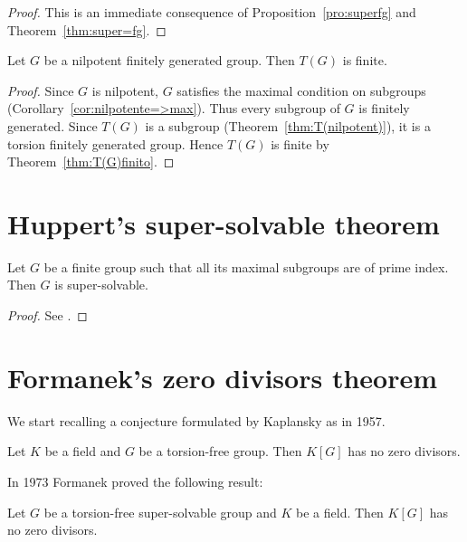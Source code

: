 \begin{proof}
    This is an immediate consequence of Proposition~\ref{pro:superfg} and 
    Theorem~\ref{thm:super=fg}.  
\end{proof}

\begin{theorem}
    Let $G$ be a nilpotent finitely generated group. Then $T(G)$ is finite. 
\end{theorem}

\begin{proof}
    Since $G$ is nilpotent, $G$ satisfies the maximal condition on subgroups 
    (Corollary~\ref{cor:nilpotente=>max}). Thus 
	every subgroup of $G$ is finitely generated. Since 
    $T(G)$ is a subgroup (Theorem~\ref{thm:T(nilpotent)}), it is a torsion finitely generated group. 
	Hence $T(G)$ is finite by Theorem~\ref{thm:T(G)finito}.
\end{proof}

\section{Huppert's super-solvable theorem}

\begin{theorem}[Huppert]
\label{thm:Huppert}
Let $G$ be a finite group such that all its maximal subgroups 
are of prime index. Then $G$ is super-solvable. 
\end{theorem}

\begin{proof}
    See \cite[Theorem 10.5.8]{MR414669}.
\end{proof}

\section{Formanek's zero divisors theorem}

We start recalling a conjecture formulated by Kaplansky as \cite[Problem 6]{MR0096696} in 1957. 

\begin{conjecture}[Kaplansky]
\label{conjecture:zero}
    Let $K$ be a field and $G$ be a torsion-free group. 
    Then $K[G]$ has no zero divisors. 
\end{conjecture}

In 1973 Formanek proved the following result:

\begin{theorem}[Formanek]
    \label{thm:Formanek:zerodivisors}
        Let $G$ be a torsion-free super-solvable 
        group and $K$ be a field. Then $K[G]$ has no zero divisors. 
\end{theorem}

